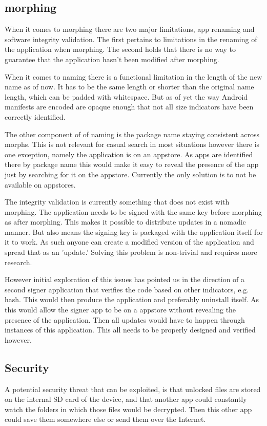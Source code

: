\documentclass[twocolumn,english,compsoc,journal]{IEEEtran}
\begin{document}
\subsection{morphing} 

When it comes to morphing there are two major limitations, app renaming and software integrity validation. 
The first pertains to limitations in the renaming of the application when morphing. 
The second holds that there is no way to guarantee that the application hasn't been modified after morphing.

When it comes to naming there is a functional limitation in the length of the new name as of now.
It has to be the same length or shorter than the original name length, which can be padded with whitespace. 
But as of yet the way Android manifests are encoded are opaque enough that not all size indicators have been correctly identified.

The other component of of naming is the package name staying consistent across morphs. 
This is not relevant for casual search in most situations however there is one exception, namely the application is on an appstore. 
As apps are identified there by package name this would make it easy to reveal the presence of the app just by searching for it on the appstore.
Currently the only solution is to not be available on appstores.

The integrity validation is currently something that does not exist with morphing. 
The application needs to be signed with the same key before morphing as after morphing. 
This makes it possible to distribute updates in a nomadic manner. 
But also means the signing key is packaged with the application itself for it to work. 
As such anyone can create a modified version of the application and spread that as an 'update.'
Solving this problem is non-trivial and requires more research.

However initial exploration of this issues has pointed us in the direction of a second signer application that verifies the code based on other indicators, e.g. hash. 
This would then produce the application and preferably uninstall itself. 
As this would allow the signer app to be on a appstore without revealing the presence of the application. 
Then all updates would have to happen through instances of this application.
This all needs to be properly designed and verified however.

\subsection{Security}
A potential security threat that can be exploited, is that
unlocked files are stored on the internal SD card of the device,
and that another app could constantly watch the folders in which
those files would be decrypted. Then this other app could save
them somewhere else or send them over the Internet.
\end{document}
